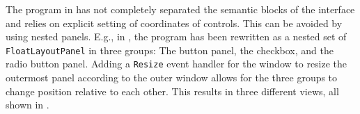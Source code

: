 \documentclass[fsharpNotes.tex]{subfiles}
\begin{document}
The program in  has not completely separated the semantic blocks of the interface and relies on explicit setting of coordinates of controls. This can be avoided by using nested panels. E.g., in , the program has been rewritten as a nested set of \lstinline{FloatLayoutPanel} in three groups: The button panel, the checkbox, and the radio button panel. Adding a \lstinline{Resize} event handler for the window to resize the outermost panel according to the outer window allows for the three groups to change position relative to each other. This results in three different views, all shown in .
%
%
%
\end{document}
